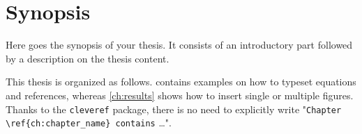 
\chapter{Synopsis}
\label{ch:synopsis}

Here goes the synopsis of your thesis. It consists of an introductory part followed by a description on the thesis content. 

\lipsum[1]

This thesis is organized as follows.  contains examples on how to typeset equations and references, whereas \cref{ch:results} shows how to insert single or multiple figures. Thanks to the \verb|cleveref| package, there is no need to explicitly write "\verb|Chapter \ref{ch:chapter_name} contains| \dots".
